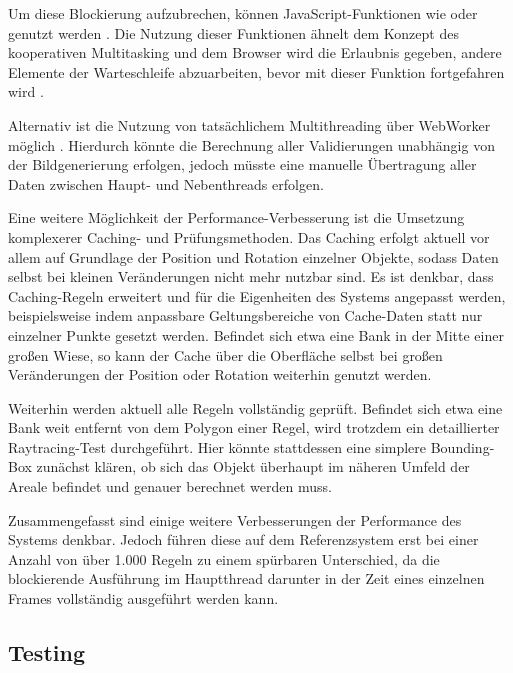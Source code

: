 Um diese Blockierung aufzubrechen, können JavaScript-Funktionen wie  oder  genutzt werden \parencite{mdncontributorsWindowSetImmediateMethod2024}. Die Nutzung dieser Funktionen ähnelt dem Konzept des kooperativen Multitasking und dem Browser wird die Erlaubnis gegeben, andere Elemente der Warteschleife abzuarbeiten, bevor mit dieser Funktion fortgefahren wird \parencite{sanchhayaeducationprivateltd.DifferencePreemptiveCooperative2024}.

Alternativ ist die Nutzung von tatsächlichem Multithreading über WebWorker möglich \parencite{mdncontributorsWebWorkersAPI2025}. Hierdurch könnte die Berechnung aller Validierungen unabhängig von der Bildgenerierung erfolgen, jedoch müsste eine manuelle Übertragung aller Daten zwischen Haupt- und Nebenthreads erfolgen.

\medskip

Eine weitere Möglichkeit der Performance-Verbesserung ist die Umsetzung komplexerer Caching- und Prüfungsmethoden. Das Caching erfolgt aktuell vor allem auf Grundlage der Position und Rotation einzelner Objekte, sodass Daten selbst bei kleinen Veränderungen nicht mehr nutzbar sind. Es ist denkbar, dass Caching-Regeln erweitert und für die Eigenheiten des Systems angepasst werden, beispielsweise indem anpassbare Geltungsbereiche von Cache-Daten statt nur einzelner Punkte gesetzt werden. Befindet sich etwa eine Bank in der Mitte einer großen Wiese, so kann der Cache über die Oberfläche selbst bei großen Veränderungen der Position oder Rotation weiterhin genutzt werden.

Weiterhin werden aktuell alle Regeln vollständig geprüft. Befindet sich etwa eine Bank weit entfernt von dem Polygon einer Regel, wird trotzdem ein detaillierter Raytracing-Test durchgeführt. Hier könnte stattdessen eine simplere Bounding-Box zunächst klären, ob sich das Objekt überhaupt im näheren Umfeld der Areale befindet und genauer berechnet werden muss.

\medskip

Zusammengefasst sind einige weitere Verbesserungen der Performance des Systems denkbar. Jedoch führen diese auf dem Referenzsystem erst bei einer Anzahl von über 1.000 Regeln zu einem spürbaren Unterschied, da die blockierende Ausführung im Hauptthread darunter in der Zeit eines einzelnen Frames vollständig ausgeführt werden kann.

\subsection{Testing}

